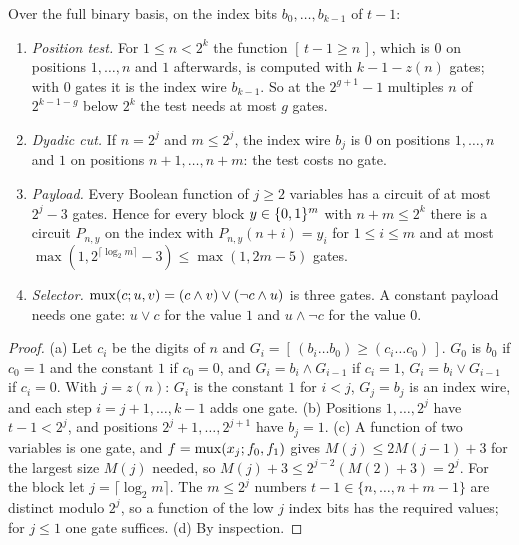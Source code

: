 \begin{lemma}\label{lem:c-trigger}
Over the full binary basis, on the index bits $b_0,\dots,b_{k-1}$ of $t-1$:
\begin{enumerate}[label=(\alph*),leftmargin=2em,itemsep=2pt,topsep=2pt]
\item \emph{Position test.} For $1\le n<2^k$ the function $[\,t-1\ge n\,]$, which is $0$ on positions
$1,\dots,n$ and $1$ afterwards, is computed with $k-1-z(n)$ gates; with $0$ gates it is the index wire
$b_{k-1}$. So at the $2^{g+1}-1$ multiples $n$ of $2^{k-1-g}$ below $2^k$ the test needs at most $g$ gates.
\item \emph{Dyadic cut.} If $n=2^j$ and $m\le2^j$, the index wire $b_j$ is $0$ on positions $1,\dots,n$ and
$1$ on positions $n+1,\dots,n+m$: the test costs no gate.
\item \emph{Payload.} Every Boolean function of $j\ge2$ variables has a circuit of at most $2^j-3$ gates.
Hence for every block $y\in\{0,1\}^m$ with $n+m\le2^k$ there is a circuit $P_{n,y}$ on the index with
$P_{n,y}(n+i)=y_i$ for $1\le i\le m$ and at most $\max(1,2^{\lceil\log_2m\rceil}-3)\le\max(1,2m-5)$ gates.
\item \emph{Selector.} $\mathrm{mux}(c;u,v)=(c\wedge v)\vee(\neg c\wedge u)$ is three gates. A constant payload needs
one gate: $u\vee c$ for the value $1$ and $u\wedge\neg c$ for the value $0$.
\end{enumerate}
\end{lemma}
\begin{proof}
(a) Let $c_i$ be the digits of $n$ and $G_i=[\,(b_i\dots b_0)\ge(c_i\dots c_0)\,]$. $G_0$ is $b_0$ if $c_0=1$
and the constant $1$ if $c_0=0$, and $G_i=b_i\wedge G_{i-1}$ if $c_i=1$, $G_i=b_i\vee G_{i-1}$ if $c_i=0$.
With $j=z(n)$: $G_i$ is the constant $1$ for $i<j$, $G_j=b_j$ is an index wire, and each step
$i=j+1,\dots,k-1$ adds one gate. (b) Positions $1,\dots,2^j$ have $t-1<2^j$, and positions
$2^j+1,\dots,2^{j+1}$ have $b_j=1$. (c) A function of two variables is one gate, and $f=\mathrm{mux}(x_j;f_0,f_1)$
gives $M(j)\le2M(j-1)+3$ for the largest size $M(j)$ needed, so $M(j)+3\le2^{j-2}(M(2)+3)=2^j$. For the block
let $j=\lceil\log_2m\rceil$. The $m\le2^j$ numbers $t-1\in\{n,\dots,n+m-1\}$ are distinct modulo $2^j$, so a
function of the low $j$ index bits has the required values; for $j\le1$ one gate suffices. (d) By inspection.
\end{proof}

